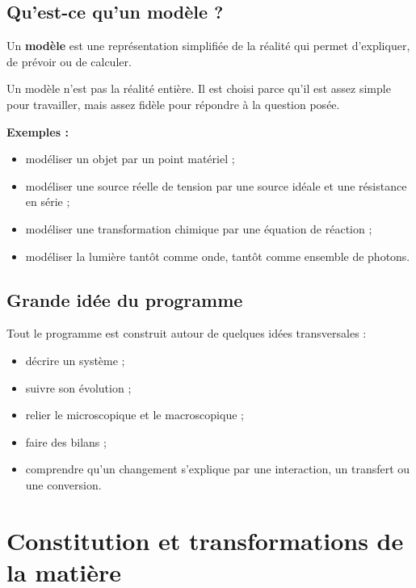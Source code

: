 \documentclass[11pt,a4paper]{article}
\begin{document}
\subsection{Qu'est-ce qu'un modèle ?}

\begin{definitionbox}
Un \textbf{modèle} est une représentation simplifiée de la réalité qui permet d'expliquer, de prévoir ou de calculer.
\end{definitionbox}

\begin{sensbox}
Un modèle n'est pas la réalité entière.  
Il est choisi parce qu'il est assez simple pour travailler, mais assez fidèle pour répondre à la question posée.
\end{sensbox}

\textbf{Exemples :}
\begin{itemize}
    \item modéliser un objet par un point matériel ;
    \item modéliser une source réelle de tension par une source idéale et une résistance en série ;
    \item modéliser une transformation chimique par une équation de réaction ;
    \item modéliser la lumière tantôt comme onde, tantôt comme ensemble de photons.
\end{itemize}

\subsection{Grande idée du programme}

Tout le programme est construit autour de quelques idées transversales :
\begin{itemize}
    \item décrire un système ;
    \item suivre son évolution ;
    \item relier le microscopique et le macroscopique ;
    \item faire des bilans ;
    \item comprendre qu'un changement s'explique par une interaction, un transfert ou une conversion.
\end{itemize}

\newpage

\section{Constitution et transformations de la matière}
\end{document}
